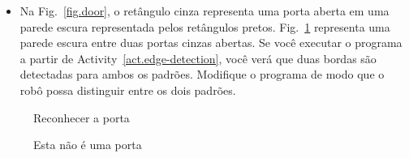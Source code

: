 \begin{framed}
\begin{itemize}
\item Na Fig.~\ref{fig.door}, o retângulo cinza representa uma porta aberta em uma parede escura representada pelos retângulos pretos. Fig.~\ref{fig.not-a-door} representa uma parede escura entre duas portas cinzas abertas. Se você executar o programa a partir de Activity~\ref{act.edge-detection}, você verá que duas bordas são detectadas para ambos os padrões. Modifique o programa de modo que o robô possa distinguir entre os dois padrões.
\end{itemize}
\end{framed}

\begin{figure}
\begin{minipage}{.45\textwidth}
\caption{Reconhecer a porta}\label{fig.door}
\end{minipage}
\hspace{\fill}
\begin{minipage}{.45\textwidth}
\caption{Esta não é uma porta}\label{fig.not-a-door}
\end{minipage}
\end{figure}


